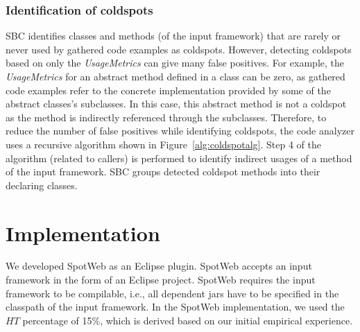 \documentclass[conference]{IEEEtran}
\newcommand{\Fix}[1]{#1}
\newcommand{\Comment}[1]{}
\begin{document}
\subsubsection{Identification of coldspots}
SBC identifies classes and methods (of the input framework) that are rarely or never used
by gathered code examples as coldspots. However, detecting coldspots based on only the
\emph{UsageMetrics} can give many false positives. For example, the
\emph{UsageMetrics} for an abstract method defined in a class can be zero, as
gathered code examples refer to the concrete implementation provided
by some of the abstract classes's subclasses. In this case, this abstract method is
not a coldspot as the method is indirectly referenced through the
subclasses. Therefore, to reduce the number of false positives
while identifying coldspots, the code analyzer uses a recursive
algorithm shown in Figure~\ref{alg:coldspotalg}. 
\Comment{The \emph{UsageMetrics} referred by the algorithm is the sum of metrics
\emph{Invocations}, \emph{Overrides}, and \emph{Implements} computed
for a method. If computed \emph{UsageMetrics} are not zero, then
the method is identified not as a coldspot. If the current method
belongs to an interface, our algorithm recursively checks whether
all the corresponding methods in the implemented classes of the
input framework are also coldspots. If all of them are coldspots, the
code analyzer identifies the current method as a coldspot. The code
analyzer uses a similar approach when the method is abstract. If the
current method under analysis does not belong to any of the
preceding categories, the code analyzer checks whether all other
methods of the input framework that invoke the current method are also
coldspots.} Step 4 of the algorithm (related to callers)
is performed to identify indirect usages of a method of the input framework. 
SBC groups detected coldspot methods into their declaring classes.

\section{Implementation}
\label{sec:implementation}
\Fix{We developed SpotWeb as an Eclipse plugin. SpotWeb accepts an input framework in the form
of an Eclipse project. SpotWeb requires the input framework to be
compilable, i.e., all dependent jars have to be specified in
the classpath of the input framework. In the SpotWeb implementation, 
we used the $HT$ percentage of 15\%, which is derived based on our
initial empirical experience.}
\end{document}
